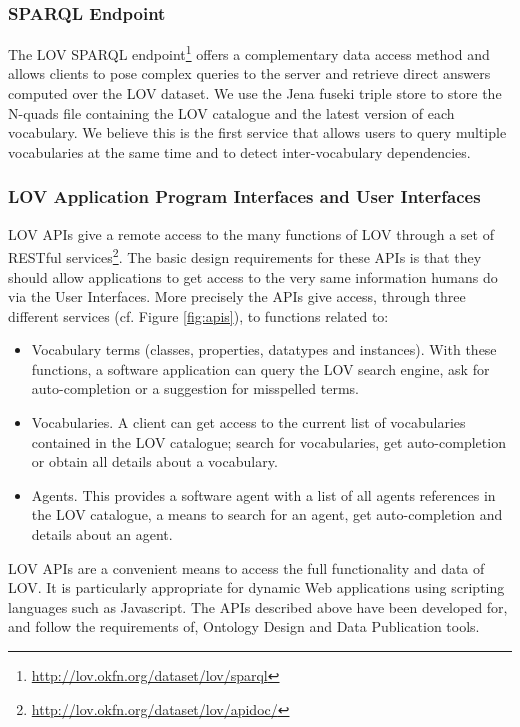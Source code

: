 \documentclass{iosart2c}
\begin{document}
\subsubsection{SPARQL Endpoint}
The LOV SPARQL endpoint\footnote{\url{http://lov.okfn.org/dataset/lov/sparql}} offers a complementary data access method and allows clients to pose complex queries to the server and retrieve direct answers computed over the LOV dataset. We use the Jena fuseki triple store to store the N-quads file containing the LOV catalogue and the latest version of each vocabulary. We believe this is the first service that allows users to query multiple vocabularies at the same time and to detect inter-vocabulary dependencies. 

\subsubsection{LOV Application Program Interfaces and User Interfaces}
LOV APIs give a remote access to the many functions of LOV through a set of RESTful services\footnote{\url{http://lov.okfn.org/dataset/lov/apidoc/}}. The basic design requirements for these APIs is that they should allow applications to get access to the very same information humans do via the User Interfaces. More precisely the APIs give access, through three different services (cf. Figure \ref{fig:apis}), to functions related to:
\begin{itemize} 
			\item Vocabulary terms (classes, properties, datatypes and instances). With these functions, a software application can query the LOV search engine, ask for auto-completion or a suggestion for misspelled terms.
			\item Vocabularies. A client can get access to the current list of vocabularies contained in the LOV catalogue; search for vocabularies, get auto-completion or obtain all details about a vocabulary.
			\item Agents. This provides a software agent with a list of all agents references in the LOV catalogue, a means to search for an agent, get auto-completion and details about an agent.
		\end{itemize}
LOV APIs are a convenient means to access the full functionality and data of LOV. It is particularly appropriate for dynamic Web applications using scripting languages such as Javascript. The APIs described above have been developed for, and follow the requirements of, Ontology Design and Data Publication tools.
\end{document}
